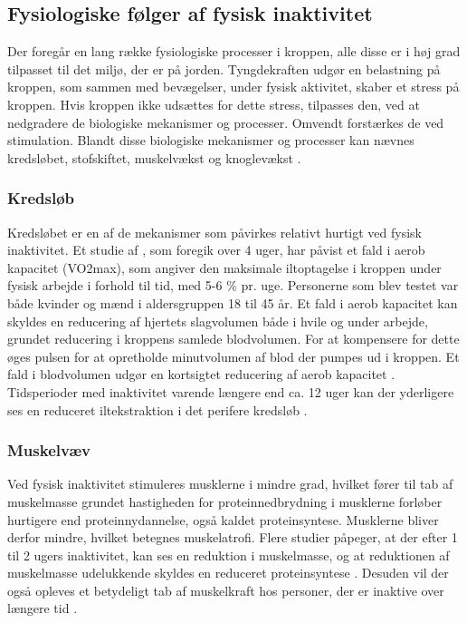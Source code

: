 \subsection{Fysiologiske følger af fysisk inaktivitet}\label{sec:FoeglerAfFiA}
Der foregår en lang række fysiologiske processer i kroppen, alle disse er i høj grad tilpasset til det miljø, der er på jorden. 
Tyngdekraften udgør en belastning på kroppen, som sammen med bevægelser, under fysisk aktivitet, skaber et stress på kroppen. 
Hvis kroppen ikke udsættes for dette stress, tilpasses den, ved at nedgradere de biologiske mekanismer og processer. Omvendt forstærkes de ved stimulation. 
Blandt disse biologiske mekanismer og processer kan nævnes kredsløbet, stofskiftet, muskelvækst og knoglevækst \citep{motionsraad2007}.

\subsubsection{Kredsløb}
Kredsløbet er en af de mekanismer som påvirkes relativt hurtigt ved fysisk inaktivitet. 
Et studie af \citeauthor{Convertino1995}, som foregik over 4 uger, har påvist et fald i aerob kapacitet (VO2max), som angiver den maksimale iltoptagelse i kroppen under fysisk arbejde i forhold til tid, med 5-6 \% pr. uge. 
Personerne som blev testet var både kvinder og mænd i aldersgruppen 18 til 45 år. 
Et fald i aerob kapacitet kan skyldes en reducering af hjertets slagvolumen både i hvile og under arbejde, grundet reducering i kroppens samlede blodvolumen. 
For at kompensere for dette øges pulsen for at opretholde minutvolumen af blod der pumpes ud i kroppen. 
Et fald i blodvolumen udgør en kortsigtet reducering af aerob kapacitet \citep{Convertino1995}. 
Tidsperioder med inaktivitet varende længere end ca. 12 uger kan der yderligere ses en reduceret iltekstraktion i det perifere kredsløb \citep{Coyle1985}.

\subsubsection{Muskelvæv}
Ved fysisk inaktivitet stimuleres musklerne i mindre grad, hvilket fører til tab af muskelmasse grundet hastigheden for proteinnedbrydning i musklerne forløber hurtigere end proteinnydannelse, også kaldet proteinsyntese. 
Musklerne bliver derfor mindre, hvilket betegnes muskelatrofi. 
Flere studier påpeger, at der efter 1 til 2 ugers inaktivitet, kan ses en reduktion i muskelmasse, og at reduktionen af muskelmasse udelukkende skyldes en reduceret proteinsyntese \citep{Douglas2006, Bloomfield1995}. 
Desuden vil der også opleves et betydeligt tab af muskelkraft hos personer, der er inaktive over længere tid \citep{Bloomfield1995}. 

